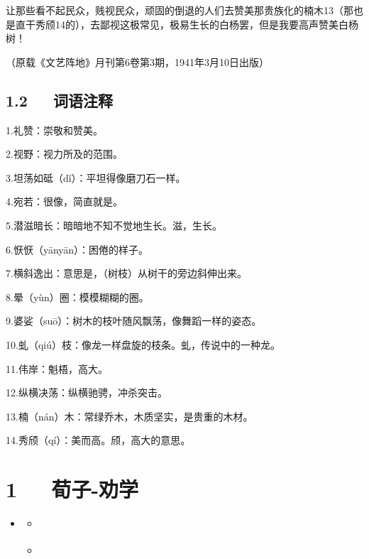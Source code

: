 \documentclass[letterpaper,10pt,english]{sphinxmanual}
\begin{document}
让那些看不起民众，贱视民众，顽固的倒退的人们去赞美那贵族化的楠木13（那也是直干秀颀14的），去鄙视这极常见，极易生长的白杨罢，但是我要高声赞美白杨树！

（原载《文艺阵地》月刊第6卷第3期，1941年3月10日出版）


\section{1.2   词语注释}
\label{\detokenize{p01_u6563_u6587/_u8305_u76fe-_u767d_u6768_u793c_u8d5e:id4}}
1.礼赞：崇敬和赞美。

2.视野：视力所及的范围。

3.坦荡如砥（dǐ）：平坦得像磨刀石一样。

4.宛若：很像，简直就是。

5.潜滋暗长：暗暗地不知不觉地生长。滋，生长。

6.恹恹（yānyān）：困倦的样子。

7.横斜逸出：意思是，（树枝）从树干的旁边斜伸出来。

8.晕（yùn）圈：模模糊糊的圈。

9.婆娑（suō）：树木的枝叶随风飘荡，像舞蹈一样的姿态。

10.虬（qiú）枝：像龙一样盘旋的枝条。虬，传说中的一种龙。

11.伟岸：魁梧，高大。

12.纵横决荡：纵横驰骋，冲杀突击。

13.楠（nán）木：常绿乔木，木质坚实，是贵重的木材。

14.秀颀（qí）：美而高。颀，高大的意思。


\chapter{1   荀子-劝学}
\label{\detokenize{p01_u6563_u6587/_u8340_u5b50-_u529d_u5b66:id1}}\label{\detokenize{p01_u6563_u6587/_u8340_u5b50-_u529d_u5b66::doc}}
\begin{sphinxShadowBox}
\begin{itemize}
\item {} 
\label{\detokenize{p01_u6563_u6587/_u8340_u5b50-_u529d_u5b66:id5}}{\hyperref[\detokenize{p01_u6563_u6587/_u8340_u5b50-_u529d_u5b66:id1}]{}}
\begin{itemize}
\item {} 
\label{\detokenize{p01_u6563_u6587/_u8340_u5b50-_u529d_u5b66:id6}}{\hyperref[\detokenize{p01_u6563_u6587/_u8340_u5b50-_u529d_u5b66:id3}]{}}

\item {} 
\label{\detokenize{p01_u6563_u6587/_u8340_u5b50-_u529d_u5b66:id7}}{\hyperref[\detokenize{p01_u6563_u6587/_u8340_u5b50-_u529d_u5b66:id4}]{}}

\end{itemize}

\end{itemize}
\end{sphinxShadowBox}
\end{document}
